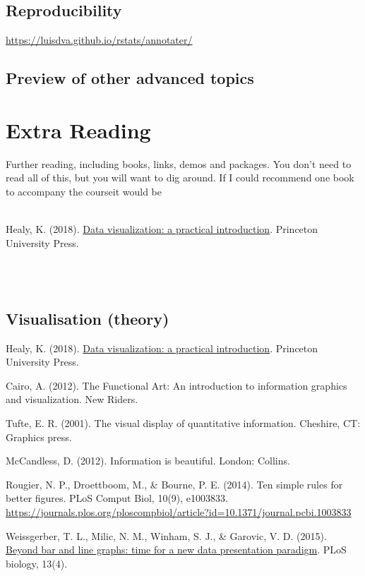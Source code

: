 \documentclass[]{book}
\newenvironment{info}
    {
    \hline\\
    }
    { 
    \\\\\hline
    }
\begin{document}
\section{Reproducibility}\label{reproducibility}

\url{https://luisdva.github.io/rstats/annotater/}

\section{Preview of other advanced
topics}\label{preview-of-other-advanced-topics}

\appendix


\chapter{Extra Reading}\label{extra-reading}

Further reading, including books, links, demos and packages. You don't
need to read all of this, but you will want to dig around. If I could
recommend one book to accompany the courseit would be

\begin{info}
Healy, K. (2018). \href{https://socviz.co/}{Data visualization: a
practical introduction}. Princeton University Press.
\end{info}

\section{Visualisation (theory)}\label{visualisation-theory}

Healy, K. (2018). \href{https://socviz.co/}{Data visualization: a
practical introduction}. Princeton University Press.

Cairo, A. (2012). The Functional Art: An introduction to information
graphics and visualization. New Riders.

Tufte, E. R. (2001). The visual display of quantitative information.
Cheshire, CT: Graphics press.

McCandless, D. (2012). Information is beautiful. London: Collins.

Rougier, N. P., Droettboom, M., \& Bourne, P. E. (2014). Ten simple
rules for better figures. PLoS Comput Biol, 10(9), e1003833.
\url{https://journals.plos.org/ploscompbiol/article?id=10.1371/journal.pcbi.1003833}

Weissgerber, T. L., Milic, N. M., Winham, S. J., \& Garovic, V. D.
(2015).
\href{https://journals.plos.org/plosbiology/article?id=10.1371/journal.pbio.1002128}{Beyond
bar and line graphs: time for a new data presentation paradigm}. PLoS
biology, 13(4).
\end{document}

